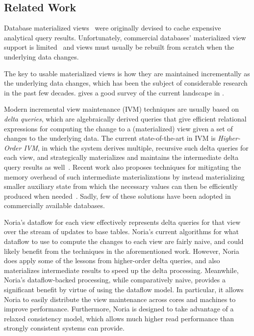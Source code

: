 \subsection*{Related Work}

Database materialized views~\cite{gupta-view-selection,lee} were originally
devised to cache expensive analytical query results. Unfortunately, commercial
databases' materialized view support is
limited~\cite{materialized-view-selection-sql-server,mssql-materialized-view-restrictions-blog,
mssql-materialized-view-restrictions} and views must usually be rebuilt from
scratch when the underlying data changes.

The key to usable materialized views is how they are maintained incrementally as
the underlying data changes, which has been the subject of considerable research
in the past few decades. \citeauthor{materialized-survey} gives a good survey of
the current landscape in \cite{materialized-survey}.

Modern incremental view maintenance (IVM) techniques are usually based on
\textit{delta queries}, which are algebraically derived queries that give
efficient relational expressions for computing the change to a (materialized)
view given a set of changes to the underlying data. The current state-of-the-art
in IVM is \textit{Higher-Order IVM}, in which the system derives multiple,
recursive such delta queries for each view, and strategically materializes and
maintains the intermediate delta query results as well~\cite{dbtoaster, hotdog}.
Recent work also proposes techniques for mitigating the memory overhead of such
intermediate materializations by instead materializing smaller auxiliary state
from which the necessary values can then be efficiently produced when
needed~\cite{memory-efficient}. Sadly, few of these solutions have been adopted
in commercially available databases.

Noria's dataflow for each view effectively represents delta queries for that
view over the stream of updates to base tables. Noria's current algorithms for
what dataflow to use to compute the changes to each view are fairly naive, and
could likely benefit from the techniques in the aforementioned work. However,
Noria does apply some of the lessons from higher-order delta queries, and
also materializes intermediate results to speed up the delta processing.
Meanwhile, Noria's dataflow-backed processing, while comparatively naive,
provides a significant benefit by virtue of using the dataflow model. In
particular, it allows Noria to easily distribute the view maintenance across
cores and machines to improve performance. Furthermore, Noria is designed to
take advantage of a relaxed consistency model, which allows much higher read
performance than strongly consistent systems can provide.

